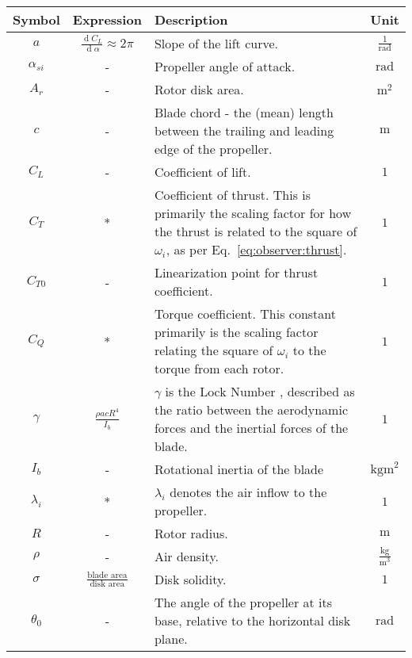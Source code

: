     \begin{table}
        \begin{tabularx}{\tablewidth}{|c|c|X|c|}\hline
            \textbf{Symbol} & \textbf{Expression} & \textbf{Description}  & \textbf{Unit} \\\hline
            $a$ & $\frac{\operatorname{d}\!C_{L}}{\operatorname{d}\!\alpha} \approx 2\pi$ & Slope of the lift curve. & $\frac{1}{\text{rad}}$ \\\hline
            $\alpha_{si}$ & - & Propeller angle of attack. & $\text{rad}$ \\\hline
            $A_{r}$ & - & Rotor disk area.   & $\text{m}^{2}$\\\hline
            $c$ & - & Blade chord - the (mean) length between the trailing and leading edge of the propeller.   & $\text{m}$ \\\hline
            $C_{L}$ & - & Coefficient of lift. & $1$ \\\hline
            $C_{T}$ & * & Coefficient of thrust. This is primarily the scaling factor for how the thrust is related to the square of $\omega_{i}$, as per Eq.~\ref{eq:observer:thrust}.  & $1$\\\hline
            $C_{T0}$ & - & Linearization point for thrust coefficient.  & $1$\\\hline
            $C_{Q}$ & * & Torque coefficient. This constant primarily is the scaling factor relating the square of $\omega_{i}$ to the torque from each rotor. & $1$\\\hline
            $\gamma$ & $\frac{\rho a c R^{4}}{I_{b}}$ & $\gamma$ is the Lock Number \citep{leishman2002principles}, described as the ratio between the aerodynamic forces and the inertial forces of the blade.   & $1$ \\ \hline
            $I_{b}$ & - & Rotational inertia of the blade  & $\text{kgm}^{2}$\\\hline
            $\lambda_{i}$ & * & $\lambda_{i}$ denotes the air inflow to the propeller. & $1$ \\\hline
            $R$ & - & Rotor radius.   & $\text{m}$ \\\hline
            $\rho$ & - & Air density.   & $\frac{\text{kg}}{\text{m}^{3}}$ \\\hline
            $\sigma$ & $\frac{\text{blade area}}{\text{disk area}}$ & Disk solidity. & $1$ \\\hline
            $\theta_{0}$ & - & The angle of the propeller at its base, relative to the horizontal disk plane. & $\text{rad}$ \\\hline

\end{tabularx}
\end{table}

